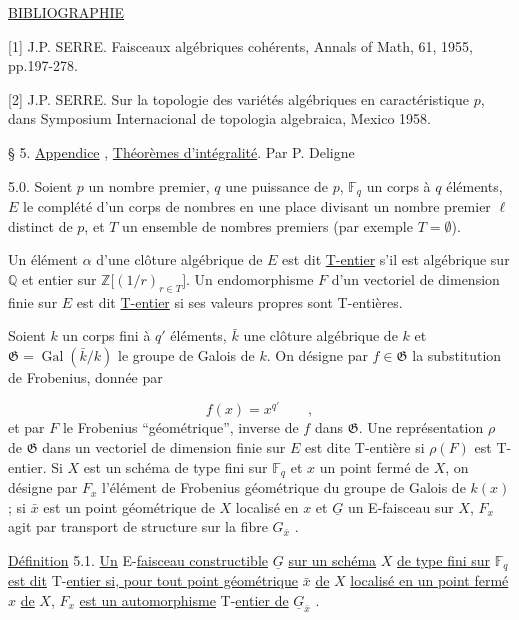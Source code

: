 \underline{BIBLIOGRAPHIE}

[1]  J.P.  SERRE.  Faisceaux algébriques cohérents, Annals of Math, 61, 1955, pp.197-278.

[2]  J.P.  SERRE.  Sur la topologie des variétés algébriques en caractéristique $p$, dans Symposium Internacional de topologia algebraica, Mexico 1958.




§ 5. \underline{Appendice} , \underline{Théorèmes d'intégralité}. Par P. Deligne

5.0. Soient $p$ un nombre premier, $q$ une puissance de $p$, $\mathbb{F}_q$ un corps à $q$ éléments, $E$ le complété d'un corps de nombres en une place divisant un nombre premier $\ell$ distinct de $p$, et $T$ un ensemble de nombres premiers (par exemple $T = \emptyset$).

Un élément $\alpha$ d'une clôture algébrique de $E$ est dit \underline{T-entier} s'il est algébrique sur $\mathbb{Q}$ et entier sur $\mathbb{Z}\bigl[(1/r)_{r \in T}\bigr]$. Un endomorphisme $F$ d'un vectoriel de dimension finie sur $E$ est dit \underline{T-entier} si ses valeurs propres sont T-entières.

Soient $k$ un corps fini à $q'$ éléments, $\bar{k}$ une clôture algébrique de $k$ et $\mathfrak{G} = \operatorname{Gal}(\bar{k}/k)$ le groupe de Galois de $k$. On désigne par $f \in \mathfrak{G}$ la substitution de Frobenius, donnée par

\begin{equation*}
f(x) = x^{q'} \qquad ,
\end{equation*}
et par $F$ le Frobenius ``géométrique'', inverse de $f$ dans $\mathfrak{G}$. Une représentation $\rho$ de $\mathfrak{G}$ dans un vectoriel de dimension finie sur $E$ est dite T-entière si $\rho(F)$ est T-entier. Si $X$ est un schéma de type fini sur $\mathbb{F}_q$ et $x$ un point fermé de $X$, on désigne par $F_x$ l'élément de Frobenius géométrique du groupe de Galois de $k(x)$ ; si $\bar{x}$ est un point géométrique de $X$ localisé en $x$ et $\underline{G}$ un E-faisceau sur $X$, $F_x$ agit par transport de structure sur la fibre $G_{\bar{x}}$ .

\underline{Définition} 5.1. \underline{Un} E-\underline{faisceau constructible} $\underline{G}$ \underline{sur un schéma} $X$ \underline{de type fini sur} $\mathbb{F}_q$ \underline{est dit} T-\underline{entier si, pour tout point géométrique} $\bar{x}$ \underline{de} $X$ \underline{localisé en un point fermé} $x$ \underline{de} $X$, $F_x$ \underline{est un automorphisme} T-\underline{entier de} $\underline{G}_{\bar{x}}$ .


